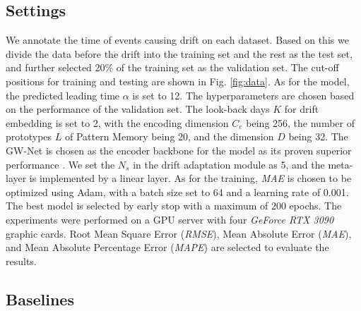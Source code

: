 \documentclass[sigconf]{acmart}
\begin{document}
\subsection{Settings}
We annotate the time of events causing drift on each dataset. Based on this we divide the data before the drift into the training set and the rest as the test set, and further selected 20\% of the training set as the validation set. The cut-off positions for training and testing are shown in Fig. \ref{fig:data}. As for the model, the predicted leading time $\alpha$ is set to 12. The hyperparameters are chosen based on the performance of the validation set. The look-back days $K$ for drift embedding is set to 2, with the encoding dimension $C_e$ being 256, the number of prototypes $L$ of Pattern Memory being 20, and the dimension $D$ being 32. The GW-Net \cite{wu2019graph} is chosen as the encoder backbone for the model as its proven superior performance \cite{jiang2021dl}. We set the $N_s$ in the drift adaptation module as 5, and the meta-layer is implemented by a linear layer. As for the training, \textit{MAE} is chosen to be optimized using Adam, with a batch size set to 64 and a learning rate of 0.001. The best model is selected by early stop with a maximum of 200 epochs. The experiments were performed on a GPU server with four \textit{GeForce RTX 3090} graphic cards. Root Mean Square Error (\textit{RMSE}), Mean Absolute Error (\textit{MAE}), and Mean Absolute Percentage Error (\textit{MAPE}) are selected to evaluate the results.

\subsection{Baselines}
\end{document}
